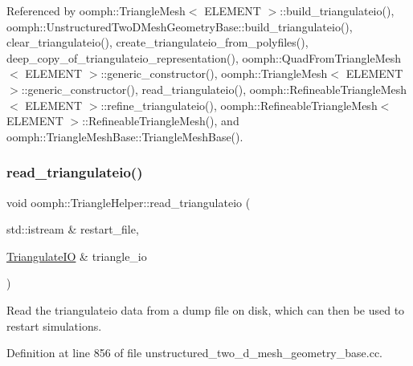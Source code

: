 Referenced by oomph\+::\+Triangle\+Mesh$<$ E\+L\+E\+M\+E\+N\+T $>$\+::build\+\_\+triangulateio(), oomph\+::\+Unstructured\+Two\+D\+Mesh\+Geometry\+Base\+::build\+\_\+triangulateio(), clear\+\_\+triangulateio(), create\+\_\+triangulateio\+\_\+from\+\_\+polyfiles(), deep\+\_\+copy\+\_\+of\+\_\+triangulateio\+\_\+representation(), oomph\+::\+Quad\+From\+Triangle\+Mesh$<$ E\+L\+E\+M\+E\+N\+T $>$\+::generic\+\_\+constructor(), oomph\+::\+Triangle\+Mesh$<$ E\+L\+E\+M\+E\+N\+T $>$\+::generic\+\_\+constructor(), read\+\_\+triangulateio(), oomph\+::\+Refineable\+Triangle\+Mesh$<$ E\+L\+E\+M\+E\+N\+T $>$\+::refine\+\_\+triangulateio(), oomph\+::\+Refineable\+Triangle\+Mesh$<$ E\+L\+E\+M\+E\+N\+T $>$\+::\+Refineable\+Triangle\+Mesh(), and oomph\+::\+Triangle\+Mesh\+Base\+::\+Triangle\+Mesh\+Base().

\mbox{\label{namespaceoomph_1_1TriangleHelper_a9b95d3b41c921cd6d8804250a366f715}} 
\subsubsection{\texorpdfstring{read\+\_\+triangulateio()}{read\_triangulateio()}}
{\footnotesize\ttfamily void oomph\+::\+Triangle\+Helper\+::read\+\_\+triangulateio (\begin{DoxyParamCaption}\item[{std\+::istream \&}]{restart\+\_\+file,  }\item[{\hyperlink{structoomph_1_1TriangulateIO}{Triangulate\+IO} \&}]{triangle\+\_\+io }\end{DoxyParamCaption})}



Read the triangulateio data from a dump file on disk, which can then be used to restart simulations. 



Definition at line 856 of file unstructured\+\_\+two\+\_\+d\+\_\+mesh\+\_\+geometry\+\_\+base.\+cc.



